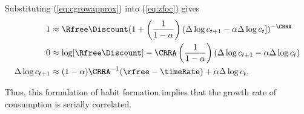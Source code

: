 Substituting (\ref{eq:cgrowapprox}) into (\ref{eq:zfoc}) gives
\begin{equation*}\begin{gathered}\begin{aligned}
        1 & \approx  \Rfree\Discount (1+\left(\frac{1}{1-\alpha}\right)\left(\Delta \log c_{t+1} - \alpha \Delta \log c_{t} \right])^{-\CRRA}
\\      0  & \approx  \log [\Rfree\Discount] - \CRRA \left(\frac{1}{1-\alpha}\right)\left(\Delta \log c_{t+1} - \alpha \Delta \log c_{t} \right)
\\ \Delta \log c_{t+1} & \approx  (1-\alpha)\CRRA^{-1}(\rfree - \timeRate) + \alpha \Delta \log c_{t}
.
\end{aligned}\end{gathered}\end{equation*}

Thus, this formulation of habit formation implies that the growth rate of consumption
is serially correlated.
